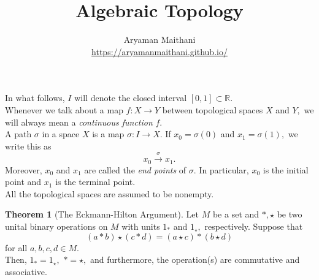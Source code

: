 \documentclass[12pt]{article}
\title{Algebraic Topology}
\author{Aryaman Maithani\\\url{https://aryamanmaithani.github.io/}}
\theoremstyle{definition}
\newtheorem{thm}{Theorem}
\numberwithin{thm}{section}
\begin{document}
\maketitle

In what follows, $I$ will denote the closed interval $[0, 1] \subset \mathbb{R}.$\\
Whenever we talk about a map $f:X\to Y$ between topological spaces $X$ and $Y,$ we will always mean a \emph{continuous function} $f.$\\
A path $\sigma$ in a space $X$ is a map $\sigma: I \to X.$ If $x_0 = \sigma(0)$ and $x_1 = \sigma(1),$ we write this as
\begin{equation*} 
	x_0 \overset{\sigma}{\longrightarrow} x_1.
\end{equation*}
Moreover, $x_0$ and $x_1$ are called the \emph{end points} of $\sigma.$ In particular, $x_0$ is the initial point and $x_1$ is the terminal point.\\
All the topological spaces are assumed to be nonempty.\\
\begin{thm}[The Eckmann-Hilton Argument] \label{thm:eckmannhilton}
	Let $M$ be a set and $*, \star$ be two unital binary operations on $M$ with units $1_*$ and $1_\star,$ respectively. Suppose that
	\begin{equation*} 
		(a * b) \star (c * d) = (a \star c) * (b \star d)
	\end{equation*}
	for all $a, b, c, d \in M.$\\
	Then, $1_* = 1_\star,$ $* = \star,$ and furthermore, the operation(s) are commutative and associative.
\end{thm}
\end{document}

